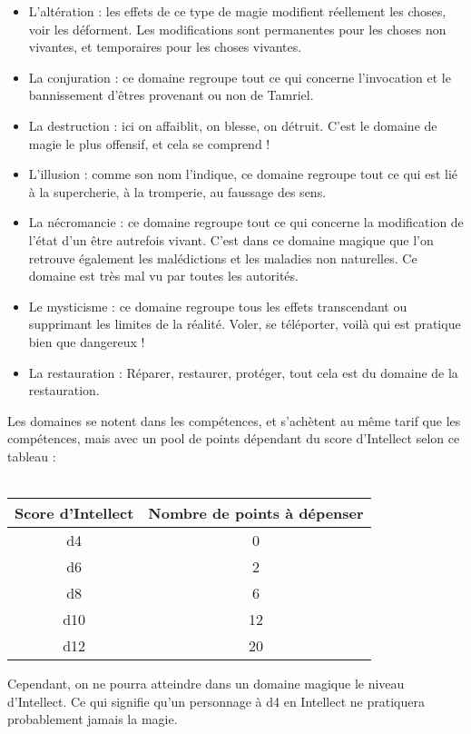 \begin{itemize}
\item
L'altération : les effets de ce type de magie modifient réellement les choses, voir les déforment. Les modifications sont permanentes pour les choses non vivantes, et temporaires pour les choses vivantes.
\item
La conjuration : ce domaine regroupe tout ce qui concerne l'invocation et le bannissement d'êtres provenant ou non de Tamriel.
\item
La destruction : ici on affaiblit, on blesse, on détruit. C'est le domaine de magie le plus offensif, et cela se comprend !
\item
L'illusion : comme son nom l'indique, ce domaine regroupe tout ce qui est lié à la supercherie, à la tromperie, au faussage des sens.
\item
La nécromancie : ce domaine regroupe tout ce qui concerne la modification de l'état d'un être autrefois vivant. C'est dans ce domaine magique que l'on retrouve également les malédictions et les maladies non naturelles. Ce domaine est très mal vu par toutes les autorités.
\item
Le mysticisme : ce domaine regroupe tous les effets transcendant ou supprimant les limites de la réalité. Voler, se téléporter, voilà qui est pratique bien que dangereux !
\item
La restauration : Réparer, restaurer, protéger, tout cela est du domaine de la restauration.
\end{itemize}

Les domaines se notent dans les compétences, et s'achètent au même tarif que les compétences, mais avec un pool de points dépendant du score d'Intellect selon ce tableau :
\\
\\
\begin{tabular}{|c|c|}
    \hline
    Score d'Intellect & Nombre de points à dépenser \\ \hline \hline
    d4 & 0  \\ \hline
    d6 & 2 \\ \hline
    d8 & 6  \\ \hline
    d10 & 12 \\ \hline
    d12 & 20 \\ \hline
\end{tabular}

Cependant, on ne pourra atteindre dans un domaine magique le niveau d'Intellect. Ce qui signifie qu'un personnage à d4 en Intellect ne pratiquera probablement jamais la magie.

